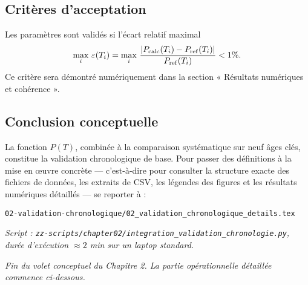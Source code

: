 \subsection{Critères d’acceptation}

Les paramètres sont validés si l’écart relatif maximal
\[
  \max_{i}\,\varepsilon(T_{i})
  = \max_{i}\,\frac{\lvert P_{\rm calc}(T_{i}) - P_{\rm ref}(T_{i})\rvert}{P_{\rm ref}(T_{i})}
  < 1\%.
\]
Ce critère sera démontré numériquement dans la section « Résultats numériques et cohérence ».

\subsection{Conclusion conceptuelle}

La fonction \(P(T)\), combinée à la comparaison systématique sur neuf âges clés, constitue la validation chronologique de base.
Pour passer des définitions à la mise en œuvre concrète — c’est-à-dire pour consulter la structure exacte des fichiers de données, les extraits de CSV, les légendes des figures et les résultats numériques détaillés — se reporter à :

\begin{center}
  \texttt{02-validation-chronologique/02\_validation\_chronologique\_details.tex}
\end{center}

\noindent\emph{Script : \texttt{zz-scripts/chapter02/integration\_validation\_chronologie.py}, durée d’exécution \(\approx2\) min sur un laptop standard.}

\noindent\emph{Fin du volet conceptuel du Chapitre 2. La partie opérationnelle détaillée commence ci-dessous.}

